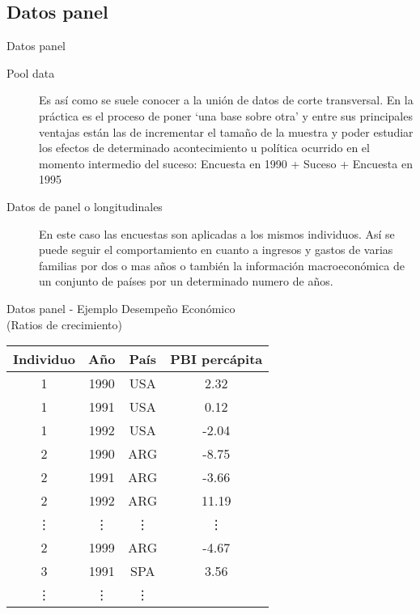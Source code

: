 \subsection{Datos panel}
\begin{frame}{Datos panel}
	\begin{description}
		\item[Pool data] Es así como se suele conocer a la unión de datos de corte transversal. En la práctica es el proceso de poner `una base sobre
		otra' y entre sus principales ventajas están las de incrementar el tamaño de la muestra y poder estudiar los efectos de determinado
		acontecimiento u política ocurrido en el momento intermedio del suceso: Encuesta en 1990 + Suceso + Encuesta en 1995
		\item[Datos de panel o longitudinales] En este caso las encuestas son aplicadas a los mismos individuos. Así se puede seguir el comportamiento en cuanto a ingresos
		y gastos de varias familias por dos o mas años o también la información macroeconómica de un conjunto de países por un determinado numero de años.
	\end{description}
\end{frame}
\begin{frame}{Datos panel - Ejemplo}
	\centering
	{\small Desempeño Económico} \\
	{\tiny (Ratios de crecimiento)}\\
	\smallskip
	\begin{tabular}{ cccc } 
		\hline
		Individuo & Año &País & PBI percápita \\
		\hline\hline
		1 & 1990 & USA & 2.32  \\
		1 & 1991 & USA & 0.12  \\
		1 & 1992 & USA & -2.04 \\
		2 & 1990 & ARG & -8.75 \\
		2 & 1991 & ARG & -3.66 \\
		2 & 1992 & ARG & 11.19 \\
		\vdots & \vdots & \vdots & \vdots \\
		2 & 1999 & ARG & -4.67 \\
		3 & 1991 & SPA & 3.56  \\
		\vdots & \vdots & \vdots & \\
		\hline
	\end{tabular}
\end{frame}